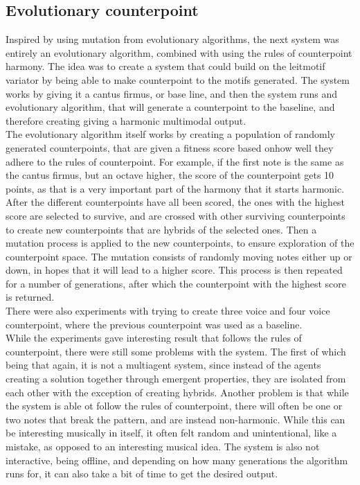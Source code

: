 \documentclass[a4paper,english]{report}
\begin{document}
	\subsection{Evolutionary counterpoint}
	Inspired by using mutation from evolutionary algorithms, the next system was entirely an evolutionary algorithm, combined with using the rules of counterpoint harmony. The idea was to create a system that could build on the leitmotif variator by being able to make counterpoint to the motifs generated. The system works by giving it a cantus firmus, or base line, and then the system runs and evolutionary algorithm, that will generate a counterpoint to the baseline, and therefore creating giving a harmonic multimodal output.\\
	The evolutionary algorithm itself works by creating a population of randomly generated counterpoints, that are given a fitness score based onhow well they adhere to the rules of counterpoint. For example, if the first note is the same as the cantus firmus, but an octave higher, the score of the counterpoint gets 10 points, as that is a very important part of the harmony that it starts harmonic. After the different counterpoints have all been scored, the ones with the highest score are selected to survive, and are crossed with other surviving counterpoints to create new counterpoints that are hybrids of the selected ones. Then a mutation process is applied to the new counterpoints, to ensure exploration of the counterpoint space. The mutation consists of randomly moving notes either up or down, in hopes that it will lead to a higher score. This process is then repeated for a number of generations, after which the counterpoint with the highest score is returned.\\
	There were also experiments with trying to create three voice and four voice counterpoint, where the previous counterpoint was used as a baseline.\\
	While the experiments gave interesting result that follows the rules of counterpoint, there were still some problems with the system. The first of which being that again, it is not a multiagent system, since instead of the agents creating a solution together through emergent properties, they are isolated from each other with the exception of creating hybrids. Another problem is that while the system is able ot follow the rules of counterpoint, there will often be one or two notes that break the pattern, and are instead non-harmonic. While this can be interesting musically in itself, it often felt random and unintentional, like a mistake, as opposed to an interesting musical idea. The system is also not interactive, being offline, and depending on how many generations the algorithm runs for, it can also take a bit of time to get the desired output.
	
\end{document}
